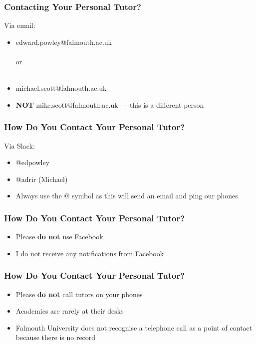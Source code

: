 \begin{frame}
	\frametitle{Contacting Your Personal Tutor?}	
	
	Via email:
	
	\begin{itemize}
		\item edward.powley@falmouth.ac.uk
		\\~\\
		or
		\\~\\
		\item michael.scott@falmouth.ac.uk
		\item \textbf{NOT} mike.scott@falmouth.ac.uk --- this is a different person
	\end{itemize}
\end{frame}

\begin{frame}
	\frametitle{How Do You Contact Your Personal Tutor?}
	
	Via Slack:	
				
	\begin{itemize}
		\item @edpowley
		\item @adrir (Michael)
		\item Always use the @ symbol as this will send an email and ping our phones
	\end{itemize}
\end{frame}

\begin{frame}
	\frametitle{How Do You Contact Your Personal Tutor?}	
	\begin{itemize}
		\item Please \textbf{do not} use Facebook
		\item I do not receive any notifications from Facebook
	\end{itemize}
\end{frame}

\begin{frame}
	\frametitle{How Do You Contact Your Personal Tutor?}	
	\begin{itemize}
		\item Please \textbf{do not} call tutors on your phones
		\item Academics are rarely at their desks
		\item Falmouth University does not recognise a telephone call as a point of contact because there is no record
	\end{itemize}
\end{frame}

